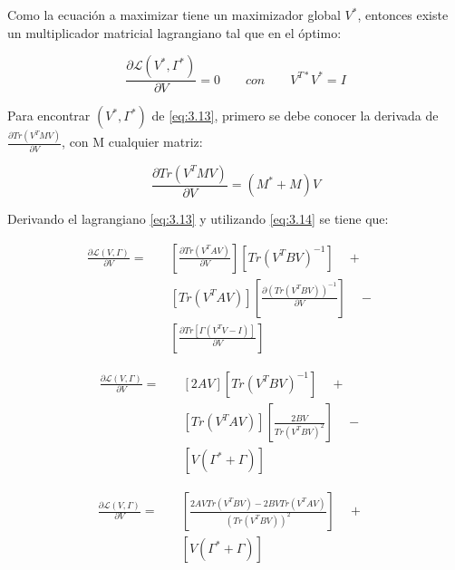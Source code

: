 Como la ecuación a maximizar tiene un maximizador global $V^*$, entonces existe un multiplicador matricial lagrangiano tal que en el óptimo:

\begin{equation}\label{eq:3.13}
\frac{\partial \mathcal{L}(V^*, \Gamma^*)}{\partial V} =  0 \qquad con \qquad V^{T*}V^* = I
\end{equation}

Para encontrar $(V^*, \Gamma^*)$ de \ref{eq:3.13}, primero se debe conocer la derivada de $\frac{\partial Tr(V^T M V)}{\partial V}$, con M cualquier matriz:

\begin{equation}\label{eq:3.14}
\frac{\partial Tr(V^T M V)}{\partial V} = (M^* +M)V  
\end{equation}

Derivando el lagrangiano \ref{eq:3.13} y utilizando \ref{eq:3.14} se tiene que:

\begin{equation*}
\begin{aligned}
\frac{\partial \mathcal{L}(V, \Gamma)}{\partial V} =&\quad  \left[\frac{\partial Tr(V^T A V) }{\partial V}\right]\left[Tr(V^T B V)^{-1}\right] \quad +& \\
&\quad \left[Tr(V^T A V)\right]\left[\frac{\partial (Tr(V^T B V))^{-1} }{\partial V}\right] \quad -& \\
&\quad \left[\frac{\partial Tr[\Gamma(V^TV-I)] }{\partial V}\right] \quad &
\end{aligned}
\end{equation*}

\begin{equation*}
\begin{aligned}
\frac{\partial \mathcal{L}(V, \Gamma)}{\partial V} =&\quad  \left[2AV\right]\left[Tr(V^T B V)^{-1}\right] \quad +& \\
&\quad \left[Tr(V^T A V)\right]\left[\frac{2BV}{Tr(V^T B V)^2}\right] \quad -& \\
&\quad \left[V (\Gamma^* + \Gamma) \right] \quad &
\end{aligned}
\end{equation*}

\begin{equation}\label{eq:3.15}
\begin{aligned}
\frac{\partial \mathcal{L}(V, \Gamma)}{\partial V} =&\quad  \left[\frac{2AV Tr(V^T B V)- 2BV Tr(V^T A V)}{(Tr(V^T B V))^2}\right] \quad +& \\
&\quad \left[V (\Gamma^* + \Gamma) \right] \quad &
\end{aligned}
\end{equation}

